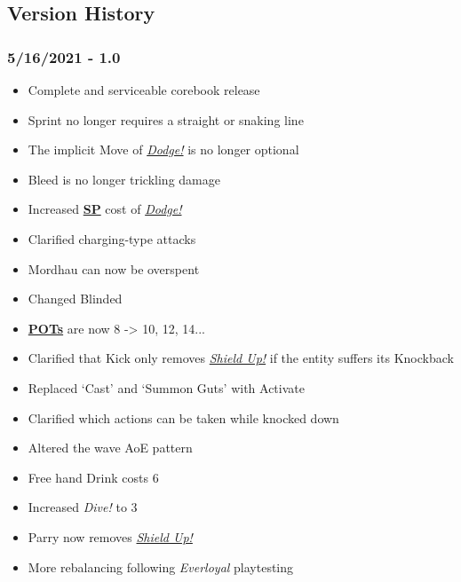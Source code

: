 \documentclass[12pt]{article}
\newcommand{\refto}[1]{\hyperlink{#1}{\textbf{#1}}}
\newcommand{\reftoit}[1]{\hyperlink{#1}{\emph{#1}}}
\begin{document}
\begin{multicols*}{2}
\vfill

\pagebreak

\section{Version History}
\subsubsection*{5/16/2021 - 1.0}
\begin{itemize}
\item Complete and serviceable corebook release
\item Sprint no longer requires a straight or snaking line
\item The implicit Move of \reftoit{Dodge!} is no longer optional
\item Bleed is no longer trickling damage
\item Increased \refto{SP} cost of \reftoit{Dodge!}
\item Clarified charging-type attacks
\item Mordhau can now be overspent
\item Changed Blinded
\item \refto{POTs} are now 8 -> 10, 12, 14...
\item Clarified that Kick only removes \reftoit{Shield Up!} if the entity suffers its Knockback
\item Replaced ‘Cast’ and ‘Summon Guts’ with Activate
\item Clarified which actions can be taken while knocked down
\item Altered the wave AoE pattern
\item Free hand Drink costs 6
\item Increased \emph{Dive!} to 3
\item Parry now removes \reftoit{Shield Up!}
\item More rebalancing following \emph{Everloyal} playtesting
\end{itemize}

\end{multicols*}
\end{document}
